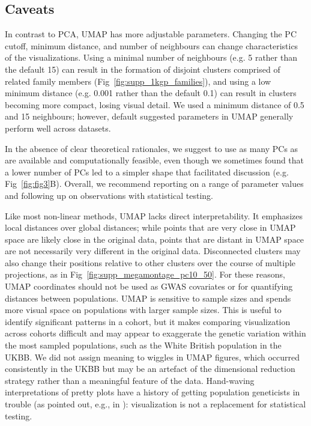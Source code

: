 \subsection{Caveats}
In contrast to PCA, UMAP has more adjustable parameters. Changing the PC cutoff, minimum distance, and number of neighbours can change characteristics of the visualizations. Using a minimal number of neighbours (e.g. 5 rather than the default 15) can result in the formation of disjoint clusters comprised of related family members (Fig~\ref{fig:supp_1kgp_families}), and using a low minimum distance (e.g. 0.001 rather than the default 0.1) can result in clusters becoming more compact, losing visual detail. We used a minimum distance of 0.5 and 15 neighbours; however, default suggested parameters in UMAP generally perform well across datasets. 

In the absence of clear theoretical rationales, we suggest to use as many PCs as are available and computationally feasible, even though we sometimes found that a lower number of PCs led to a simpler shape that facilitated discussion (e.g. Fig~\ref{fig:fig3}B). Overall, we recommend reporting on a range of parameter values and following up on observations with statistical testing. 

Like most non-linear methods, UMAP lacks direct interpretability. It emphasizes local distances over global distances; while points that are very close in UMAP space are likely close in the original data, points that are distant in UMAP space are not necessarily very different in the original data. Disconnected clusters may also change their positions relative to other clusters over the course of multiple projections, as in Fig~\ref{fig:supp_megamontage_pc10_50}. For these reasons, UMAP coordinates should not be used as GWAS covariates or for quantifying distances between populations. UMAP is sensitive to sample sizes and spends more visual space on populations with larger sample sizes. This is useful to identify significant patterns in a cohort, but it makes comparing visualization across cohorts difficult and may appear to exaggerate the genetic variation within the most sampled populations, such as the White British population in the UKBB. We did not assign meaning to wiggles in UMAP figures, which occurred consistently in the UKBB but may be an artefact of the dimensional reduction strategy rather than a meaningful feature of the data. Hand-waving interpretations of pretty plots have a history of getting population geneticists in trouble (as pointed out, e.g., in \citep{novembre2008interpreting}): visualization is not a replacement for statistical testing.

